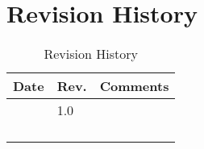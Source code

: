 \chapter{Revision History}\label{revision-history}

\begin{longtable}[]{@{}lll@{}}
\toprule
Date & Rev. & Comments\tabularnewline
\midrule
\endhead
& 1.0 &\tabularnewline
& &\tabularnewline
& &\tabularnewline
& &\tabularnewline
\bottomrule
\caption{Revision History}
\end{longtable}

